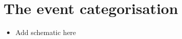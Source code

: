 \chapter{The \Hgg event categorisation}\label{app:event_categorisation}

\begin{itemize}
    \item Add schematic here
\end{itemize}